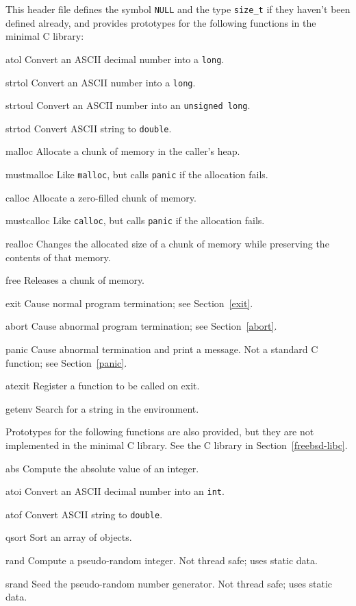 \label{stdlib-h}
\begin{apidesc}
	This header file defines the symbol {\tt NULL}
	and the type {\tt size_t}
	if they haven't been defined already,
	and provides prototypes
	for the following functions in the minimal C library:
	\begin{icsymlist}
	\item[atol]
		Convert an ASCII decimal number into a {\tt long}.
	\item[strtol]
		Convert an ASCII number into a {\tt long}.
	\item[strtoul]
		Convert an ASCII number into an {\tt unsigned long}.
	\item[strtod]
		Convert ASCII string to \texttt{double}.
	\item[malloc]
		Allocate a chunk of memory in the caller's heap.
	\item[mustmalloc]
		Like {\tt malloc},
		but calls {\tt panic} if the allocation fails.
	\item[calloc]
		Allocate a zero-filled chunk of memory.
	\item[mustcalloc]
		Like {\tt calloc},
		but calls {\tt panic} if the allocation fails.
	\item[realloc]
		Changes the allocated size of a chunk of memory while
		preserving the contents of that memory.
	\item[free]
		Releases a chunk of memory.
	\item[exit]
		Cause normal program termination; see Section~\ref{exit}.
	\item[abort]
		Cause abnormal program termination; see Section~\ref{abort}.
	\item[panic]
		Cause abnormal termination and print a message.
		Not a standard C function; see Section~\ref{panic}.
	\item[atexit]
		Register a function to be called on exit.
	\item[getenv]
	\label{getenv}
		Search for a string in the environment.
	\end{icsymlist}

	Prototypes for the following functions are also provided, but they
	are not implemented in the minimal C library. See the \freebsd{} C
	library in Section~\ref{freebsd-libc}.
	\begin{icsymlist}
	\item[abs]
		Compute the absolute value of an integer.
	\item[atoi]	\label{atoi}
		Convert an ASCII decimal number into an {\tt int}.
	\item[atof]
		Convert ASCII string to \texttt{double}.
	\item[qsort]
		Sort an array of objects.
	\item[rand]
		Compute a pseudo-random integer.
		Not thread safe; uses static data.
	\item[srand]
		Seed the pseudo-random number generator.
		Not thread safe; uses static data.
	\end{icsymlist}

\end{apidesc}

